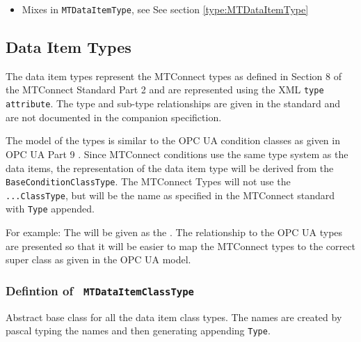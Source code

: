 \begin{itemize}
\item Mixes in \texttt{MTDataItemType}, see See section \ref{type:MTDataItemType}
\end{itemize}
\FloatBarrier
\subsection{Data Item Types} \label{model:DataItemTypes}

The data item types represent the MTConnect types as defined in Section 8 of the 
MTConnect Standard Part 2 \cite{MTCPart2} and are represented using the XML \texttt{type} 
\texttt{attribute}. The type and sub-type relationships are given in the standard and are 
not documented in the companion specifiction. 

The model of the types is similar to the OPC UA condition classes as given in OPC UA Part 9
\cite{UAPart9}. Since MTConnect conditions use the same type system as the data items, 
the representation of the data item type will be derived from the \texttt{BaseConditionClassType}. 
The MTConnect Types will not use the \texttt{...ClassType}, but will be the name as specified
in the MTConnect standard with \texttt{Type} appended.

For example: The  will be given as the . 
The relationship to the  OPC UA types are presented so that it will be
easier to map the MTConnect types to the correct super class as given in the OPC UA model.

\subsubsection{Defintion of \texttt{ MTDataItemClassType}}
  \label{type:MTDataItemClassType}

\FloatBarrier

Abstract base class for all the data item class types. The names are created by pascal typing the names
and then generating appending \texttt{Type}.

